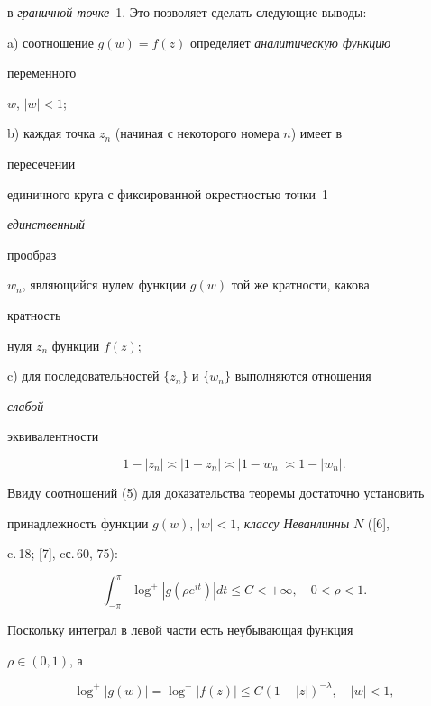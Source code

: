 в {\it граничной точке}~1. Это позволяет сделать следующие выводы: 


 


a) соотношение $g(w)=f(z)$ определяет {\it аналитическую функцию} 


переменного 


$w$, $|w|<1$; 


 


b) каждая точка $z_n$ (начиная с некоторого номера $n$) имеет в 


пересечении 


единичного круга с фиксированной окрестностью точки~1 {\it единственный 


прообраз} $w_n$, являющийся нулем функции $g(w)$ той же кратности, какова 


кратность 


нуля $z_n$ функции $f(z)$; 


 


c) для последовательностей $\{z_n\}$ и $\{w_n\}$ выполняются отношения 


{\it слабой 


эквивалентности} 


\begin{equation} 


1-|z_n|\asymp|1-z_n|\asymp|1-w_n|\asymp1-|w_n|. 


\end{equation} 


 


Ввиду соотношений (5) для доказательства теоремы достаточно установить 


принадлежность функции $g(w)$, $|w|<1$, {\it классу Неванлинны} $N$ ([6],


c.\,18; [7], cс.\,60, 75): 


$$ 


\int^\pi_{-\pi}\log^+|g(\rho e^{it})|d t\le C<+\infty,\quad 


0<\rho<1. 


$$ 


Поскольку интеграл в левой части есть неубывающая функция 


$\rho\in(0,1)$, а 


$$ 


\log^+|g(w)|=\log^+|f(z)|\le C(1-|z|)^{-\lambda},\quad |w|<1, 


$$ 


